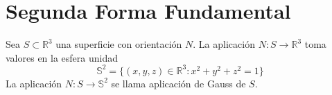 
\section{Segunda Forma Fundamental}

\begin{defn}
  Sea $S \subset \mathbb{R}^{3}$ una superficie con orientación $N$. La aplicación $N : S \to \mathbb{R}^{3}$ toma valores en la esfera unidad
  \[ 
    \mathbb{S}^{2} = \{ (x, y, z) \in \mathbb{R}^{3} : x^{2} + y^{2} + z^{2} = 1 \} 
  \] 
  La aplicación $N : S \to \mathbb{S}^{2}$ se llama aplicación de Gauss de $S$.
\end{defn}

